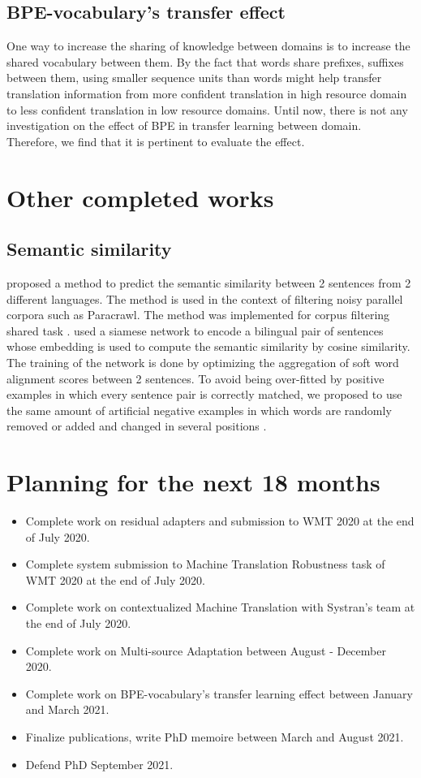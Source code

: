 \documentclass[12pt,a4paper,twoside]{report}
\theoremstyle{definition}
\begin{document}
\subsection*{BPE-vocabulary's transfer effect}
One way to increase the sharing of knowledge between domains is to increase the shared vocabulary between them. By the fact that words share prefixes, suffixes between them, using smaller sequence units than words might help transfer translation information from more confident translation in high resource domain to less confident translation in low resource domains. Until now, there is not any investigation on the effect of BPE in transfer learning between domain. Therefore, we find that it is pertinent to evaluate the effect.

\section*{Other completed works}

\subsection*{Semantic similarity}
\cite{pham18fixing} proposed a method to predict the semantic similarity between 2 sentences from 2 different languages. The method is used in the context of filtering noisy parallel corpora such as Paracrawl. The method was implemented for corpus filtering shared task  \cite{koehn18findings}. \cite{pham18fixing} used a siamese network to encode a bilingual pair of sentences whose embedding is used to compute the semantic similarity by cosine similarity. The training of the network is done by optimizing the aggregation of soft word alignment scores between 2 sentences. To avoid being over-fitted by positive examples in which every sentence pair is correctly matched, we proposed to use the same amount of artificial negative examples in which words are randomly removed or added and changed in several positions
.
\section*{Planning for the next 18 months}

\begin{itemize}
\item Complete work on residual adapters and submission to WMT 2020 at the end of July 2020.
\item Complete system submission to Machine Translation Robustness task of WMT 2020 at the end of July 2020.
\item Complete work on contextualized Machine Translation with Systran's team at the end of July 2020.
\item Complete  work on Multi-source Adaptation between August - December 2020.
\item Complete work on BPE-vocabulary's transfer learning effect between January and March 2021.
\item Finalize publications, write PhD memoire between March and August 2021.
\item Defend PhD September 2021.
\end{itemize}



\end{document}
